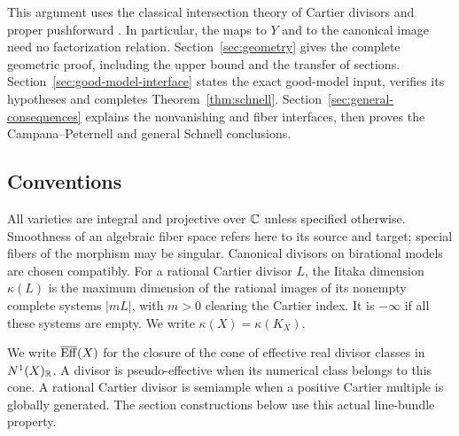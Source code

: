 This argument uses the classical intersection theory of Cartier
divisors and proper pushforward \cite[Chapter~2]{Fulton1998}.
In particular, the maps to $Y$ and to the canonical image need no factorization
relation. Section~\ref{sec:geometry} gives the complete geometric
proof, including the upper bound and the transfer of sections.
Section~\ref{sec:good-model-interface} states the exact good-model
input, verifies its hypotheses and completes
Theorem~\ref{thm:schnell}. Section~\ref{sec:general-consequences}
explains the nonvanishing and fiber interfaces, then proves the
Campana--Peternell and general Schnell conclusions.

\subsection{Conventions}

All varieties are integral and projective over $\mathbb C$ unless specified
otherwise. Smoothness of an algebraic fiber space refers here to its
source and target; special fibers of the morphism may be singular.
Canonical divisors on birational models are chosen compatibly.
For a rational Cartier divisor $L$, the Iitaka dimension $\kappa(L)$
is the maximum dimension of the rational images of its nonempty
complete systems $|mL|$, with $m>0$ clearing the Cartier index.
It is $-\infty$ if all these systems are empty. We write
$\kappa(X)=\kappa(K_X)$.

We write $\overline{\operatorname{Eff}}(X)$ for the closure of the cone of effective real
divisor classes in $N^1(X)_\mathbb R$. A divisor is pseudo-effective when
its numerical class belongs to this cone. A rational Cartier divisor
is semiample when a positive Cartier multiple is globally generated.
The section constructions below use this actual line-bundle property.
